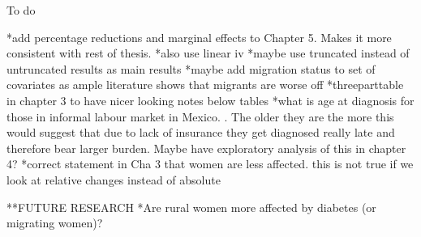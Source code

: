 To do

*add percentage reductions and marginal effects to Chapter 5. Makes it more consistent with rest of thesis.
*also use linear iv
*maybe use truncated instead of untruncated results as main results
*maybe add migration status to set of covariates as ample literature shows that migrants are worse off
*threeparttable in chapter 3 to have nicer looking notes below tables
*what is age at diagnosis for those in informal labour market in Mexico. . The older they are the more this would suggest that due to lack of insurance they get diagnosed really late and therefore bear larger burden. Maybe have exploratory analysis of this in chapter 4?
*correct statement in Cha 3 that women are less affected. this is not true if we look at relative changes instead of absolute


**FUTURE RESEARCH
*Are rural women more affected by diabetes (or migrating women)?